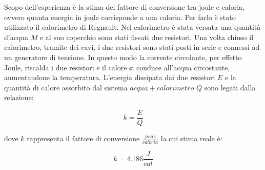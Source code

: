 Scopo dell'esperienza è la stima del fattore di conversione tra joule e caloria, ovvero quanta energia in joule corrisponde a una caloria. Per farlo è stato utilizzato il calorimetro di Regnault. Nel calorimetro è stata versata una quantità d'acqua $M$ e al suo coperchio sono stati fissati due resistori. Una volta chiuso il calorimetro, tramite dei cavi, i due resistori sono stati posti in serie e connessi ad un generatore di tensione. In questo modo la corrente circolante, per effetto Joule, riscalda i due resistori e il calore si conduce all'acqua circostante, aumentandone la temperatura. L'energia dissipata dai due resistori $E$ e la quantità di calore assorbito dal sistema $acqua+calorimetro$ $Q$ sono legati dalla relazione:

\begin{equation}
	k = \frac{E}{Q}
\end{equation}

dove $k$ rappresenta il fattore di conversione $\frac{joule}{caloria}$ la cui stima reale è:

\begin{equation}
	k = 4.186 \frac{J}{cal}
\end{equation}

